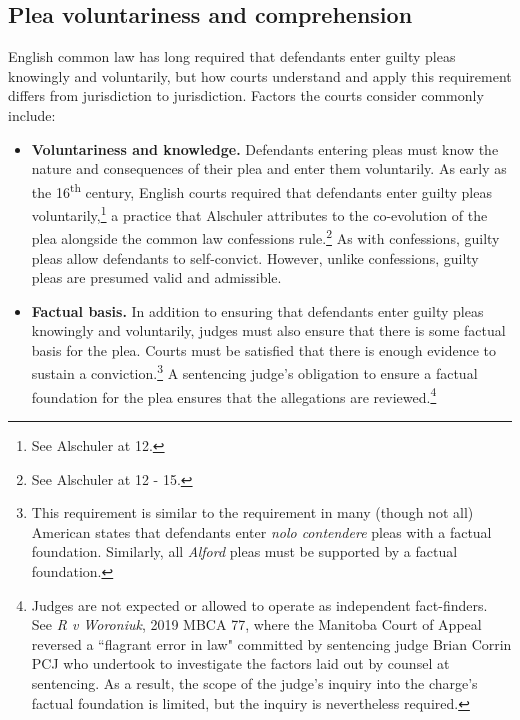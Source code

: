 \subsection{Plea voluntariness and comprehension}

English common law has long required that defendants enter guilty pleas knowingly and voluntarily, but how courts understand and apply this requirement differs from jurisdiction to jurisdiction. Factors the courts consider commonly include:

\begin{itemize}
\item \textbf{Voluntariness and knowledge.} Defendants entering pleas must know the nature and consequences of their plea and enter them voluntarily. As early as the 16\textsuperscript{th} century, English courts required that defendants enter guilty pleas voluntarily,\footnote{See Alschuler at 12.} a practice that Alschuler attributes to the co-evolution of the plea alongside the common law confessions rule.\footnote{See Alschuler at 12 - 15.} As with confessions, guilty pleas allow defendants to self-convict. However, unlike confessions, guilty pleas are presumed valid and admissible.
\item \textbf{Factual basis.} In addition to ensuring that defendants enter guilty pleas knowingly and voluntarily, judges must also ensure that there is some factual basis for the plea. Courts must be satisfied that there is enough evidence to sustain a conviction.\footnote{This requirement is similar to the requirement in many (though not all) American states that defendants enter \textit{nolo contendere} pleas with a factual foundation. Similarly, all \textit{Alford} pleas must be supported by a factual foundation.} A sentencing judge's obligation to ensure a factual foundation for the plea ensures that the allegations are reviewed.\footnote{Judges are not expected or allowed to operate as independent fact-finders. See \textit{R v Woroniuk}, 2019 MBCA 77, where the Manitoba Court of Appeal reversed a ``flagrant error in law" committed by sentencing judge Brian Corrin PCJ who undertook to investigate the factors laid out by counsel at sentencing. As a result, the scope of the judge's inquiry into the charge's factual foundation is limited, but the inquiry is nevertheless required.}

\end{itemize}
